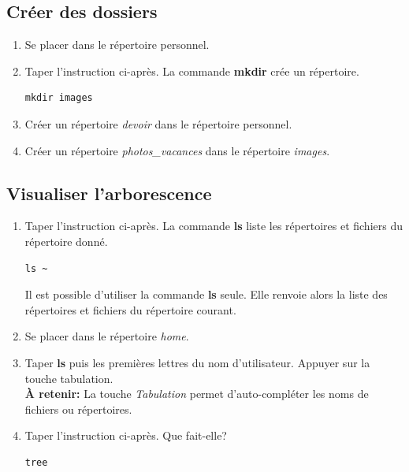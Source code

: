 \documentclass[a4paper,11pt]{article}
\begin{document}
\begin{Form}
\subsection{Créer des dossiers}
\begin{activite}
\begin{enumerate}
\item Se placer dans le répertoire personnel.
\item Taper l'instruction ci-après. La commande \textbf{mkdir} crée un répertoire.
\begin{lstlisting}
mkdir images
\end{lstlisting}
\item Créer un répertoire \emph{devoir} dans le répertoire personnel.
\item Créer un répertoire \emph{photos\_vacances} dans le répertoire \emph{images}.
\end{enumerate}
\end{activite}
\subsection{Visualiser l'arborescence}
\begin{activite}
\begin{enumerate}
\item Taper l'instruction ci-après. La commande \textbf{ls} liste les répertoires et fichiers du répertoire donné.
\begin{lstlisting}
ls ~
\end{lstlisting}
Il est possible d'utiliser la commande \textbf{ls} seule. Elle renvoie alors la liste des répertoires et fichiers du répertoire courant.
\item Se placer dans le répertoire \emph{home}.
\item Taper \textbf{ls} puis les premières lettres du nom d'utilisateur. Appuyer sur la touche tabulation.\\
\textbf{À retenir:} La touche \emph{Tabulation} permet d'auto-compléter les noms de fichiers ou répertoires.
\item Taper l'instruction ci-après. Que fait-elle?
\begin{lstlisting}
tree
\end{lstlisting}
\end{enumerate}
\end{activite}

\end{Form}
\end{document}
